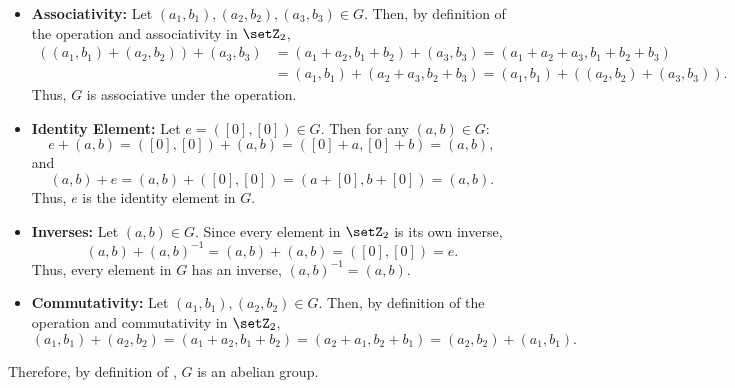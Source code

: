 \begin{enumerate}
\begin{subprove}
\begin{itemize}
      \item \textbf{Associativity:}
        Let $(a_1, b_1),(a_2, b_2),(a_3, b_3)\in G$. 
        Then, by definition of the operation and associativity in $\setZ_2$,
        \begin{align*}
          ((a_1, b_1) + (a_2, b_2)) + (a_3, b_3) 
          &= (a_1 + a_2, b_1 + b_2) + (a_3, b_3) = (a_1 + a_2 + a_3, b_1 + b_2 + b_3) \\
          &= (a_1, b_1) + (a_2 + a_3, b_2 + b_3) = (a_1, b_1) + ((a_2, b_2) + (a_3, b_3)).
        \end{align*}
        Thus, $G$ is associative under the operation.
      \item \textbf{Identity Element:}
        Let $e = ([0],[0]) \in G$. Then for any $(a, b) \in G$:
        \[
          e + (a, b) = ([0],[0]) + (a, b) = ([0] + a, [0] + b) = (a, b),
        \]
        and
        \[
          (a, b) + e = (a, b) + ([0],[0]) = (a + [0], b + [0]) = (a, b).
        \]
        Thus, $e$ is the identity element in $G$.
      \item \textbf{Inverses:}
        Let $(a, b) \in G$. Since every element in $\setZ_2$ is its own inverse,
        \[
          (a, b) + (a, b)^{-1} = (a, b) + (a, b) = ([0],[0]) = e.
        \]
        Thus, every element in $G$ has an inverse, $(a, b)^{-1}=(a, b)$.
      \item \textbf{Commutativity:}
        Let $(a_1, b_1),(a_2, b_2)\in G$. 
        Then, by definition of the operation and commutativity in $\setZ_2$,
        \[
          (a_1, b_1) + (a_2, b_2) = (a_1 + a_2, b_1 + b_2) = (a_2 + a_1, b_2 + b_1) = (a_2, b_2) + (a_1, b_1).
        \]
    \end{itemize}
    Therefore, by definition of , $G$ is an abelian group.
  \end{subprove}









\end{enumerate}
